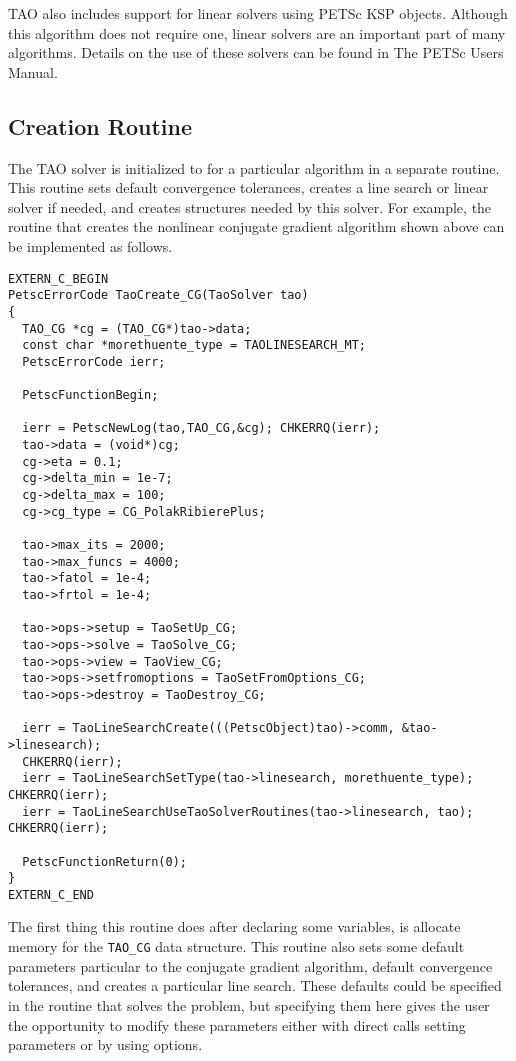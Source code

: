 TAO also includes support for linear solvers using PETSc KSP objects.  
Although this algorithm
does not require one, linear solvers are an important part of many
algorithms.  Details on the use of these solvers can be found in
The PETSc Users Manual.

\subsection{Creation Routine}
The TAO solver is initialized to for a particular algorithm in a separate
routine.  This routine sets default convergence tolerances, creates a
line search or linear solver if needed, and creates structures needed
by this solver.   For example, the routine that creates the nonlinear
conjugate gradient algorithm shown above can be implemented as follows.
\begin{verbatim}
EXTERN_C_BEGIN
PetscErrorCode TaoCreate_CG(TaoSolver tao)
{
  TAO_CG *cg = (TAO_CG*)tao->data;
  const char *morethuente_type = TAOLINESEARCH_MT;
  PetscErrorCode ierr;

  PetscFunctionBegin;

  ierr = PetscNewLog(tao,TAO_CG,&cg); CHKERRQ(ierr);
  tao->data = (void*)cg;
  cg->eta = 0.1;
  cg->delta_min = 1e-7;
  cg->delta_max = 100;
  cg->cg_type = CG_PolakRibierePlus;

  tao->max_its = 2000;
  tao->max_funcs = 4000;
  tao->fatol = 1e-4;
  tao->frtol = 1e-4;

  tao->ops->setup = TaoSetUp_CG;
  tao->ops->solve = TaoSolve_CG;
  tao->ops->view = TaoView_CG;
  tao->ops->setfromoptions = TaoSetFromOptions_CG;
  tao->ops->destroy = TaoDestroy_CG;

  ierr = TaoLineSearchCreate(((PetscObject)tao)->comm, &tao->linesearch);
  CHKERRQ(ierr);
  ierr = TaoLineSearchSetType(tao->linesearch, morethuente_type); CHKERRQ(ierr);
  ierr = TaoLineSearchUseTaoSolverRoutines(tao->linesearch, tao); CHKERRQ(ierr);

  PetscFunctionReturn(0);
}
EXTERN_C_END
\end{verbatim}
The first thing this routine does after declaring some variables, is allocate
memory for the {\tt TAO\_CG} data structure.
This routine also sets some default parameters particular to the conjugate
gradient algorithm, default convergence tolerances, and creates
a particular line search.
These defaults could be specified in the routine that solves the problem,
but specifying them here gives the user the opportunity to modify these
parameters either with direct calls setting parameters or by using options.

